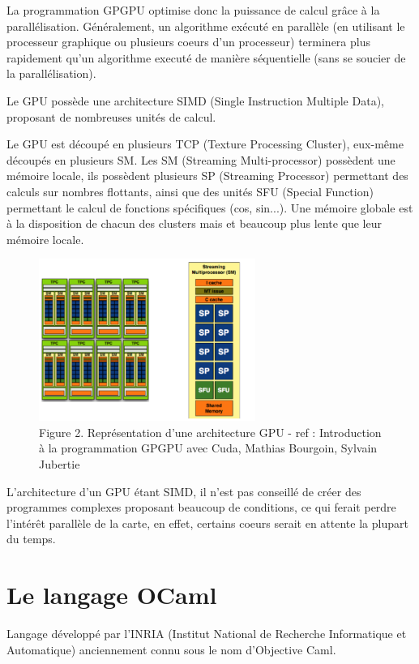 \documentclass{report}
\begin{document}
La programmation GPGPU optimise donc la puissance de calcul grâce à la parallélisation. Généralement, un algorithme exécuté en parallèle (en utilisant le processeur graphique ou plusieurs coeurs d'un processeur) terminera plus rapidement qu'un algorithme executé de manière séquentielle (sans se soucier de la parallélisation).  \newline

Le GPU possède une architecture SIMD (Single Instruction Multiple Data), proposant de nombreuses unités de calcul. \newline

Le GPU est découpé en plusieurs TCP (Texture Processing Cluster), eux-même découpés en plusieurs SM. Les SM (Streaming Multi-processor) possèdent une mémoire locale, ils possèdent plusieurs SP (Streaming Processor) permettant des calculs sur nombres flottants, ainsi que des unités SFU (Special Function) permettant le calcul de fonctions spécifiques (cos, sin...). Une mémoire globale est à la disposition de chacun des clusters mais et beaucoup plus lente que leur mémoire locale. \newline

\begin{figure}[!h]
\begin{center}
\includegraphics[height=150pt]{images_finales/image2.png}
\end{center}
\caption{Figure 2. Représentation d'une architecture GPU - ref : Introduction à la programmation GPGPU avec Cuda, Mathias Bourgoin, Sylvain Jubertie}
\label{test2}
\end{figure}

L'architecture d'un GPU étant SIMD, il n'est pas conseillé de créer des programmes complexes proposant beaucoup de conditions, ce qui ferait perdre l'intérêt parallèle de la carte, en effet, certains coeurs serait en attente la plupart du temps.

\section{Le langage OCaml}
Langage développé par l'INRIA (Institut National de Recherche Informatique et Automatique) anciennement connu sous le nom d'Objective Caml.\newline
\end{document}
